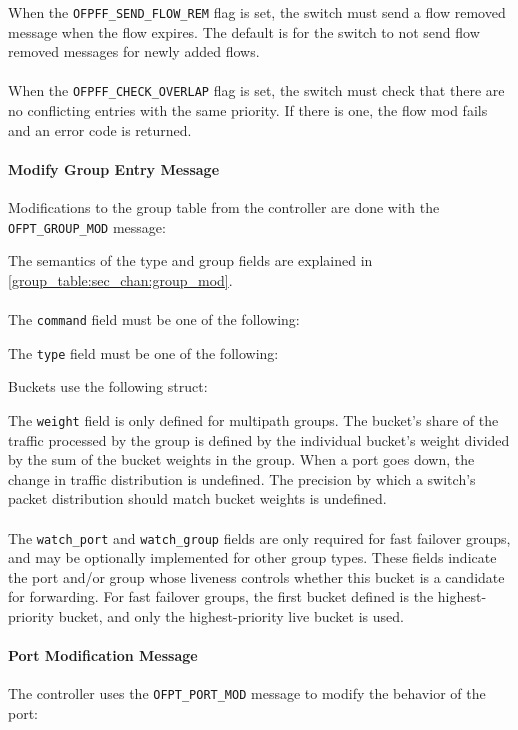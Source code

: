 
When the \verb|OFPFF_SEND_FLOW_REM| flag is set, the switch must send a flow removed message when the flow expires.  The default is for the switch to not send flow removed messages for newly added flows.  
\\\\
When the \verb|OFPFF_CHECK_OVERLAP| flag is set, the switch must check that there are no conflicting entries with the same priority. If there is one, the flow mod fails and an error code is returned.

\paragraph{Modify Group Entry Message}
Modifications to the group table from the controller are done with the \verb|OFPT_GROUP_MOD| message:


The semantics of the type and group fields are explained in \ref{group_table:sec_chan:group_mod}.
\\\\
The \verb|command| field must be one of the following:


The \verb|type| field must be one of the following:


Buckets use the following struct:


The \verb|weight| field is only defined for multipath groups.  The bucket's share of the traffic processed by the group is defined by the individual bucket's weight divided by the sum of the bucket weights in the group.  When a port goes down, the change in traffic distribution is undefined.  The precision by which a switch's packet distribution should match bucket weights is undefined.
\\\\
The \verb|watch_port| and \verb|watch_group| fields are only required for fast failover groups, and may be optionally implemented for other group types.  These fields indicate the port and/or group whose liveness controls whether this bucket is a candidate for forwarding.  For fast failover groups, the first bucket defined is the highest-priority bucket, and only the highest-priority live bucket is used.

\paragraph{Port Modification Message}
The controller uses the \verb|OFPT_PORT_MOD| message to modify the behavior of the port:

